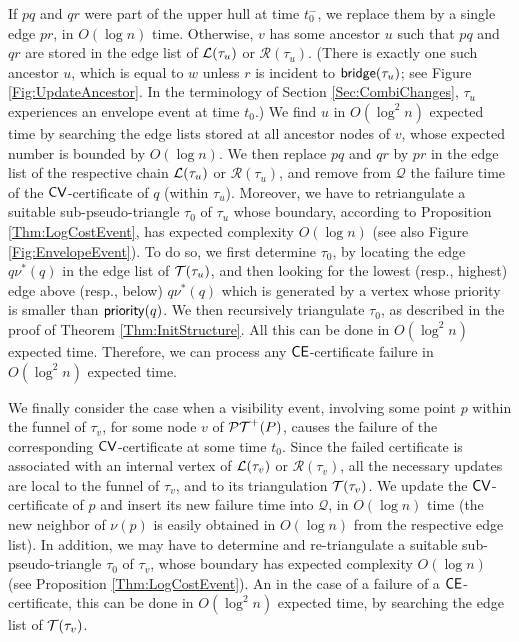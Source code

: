 \documentclass[11pt]{article}
\def\bridge{{\sf bridge}}
\def\PT{{\cal PT}}
\def\CV{{\sf CV}}
\def\CE{{\sf CE}}
\def\T{{\cal T}}
\def\prior{{\sf priority}}
\def\Q{\mathcal{Q}}
\def\L{{\cal L}}
\def\R{\mathcal{R}}
\begin{document}
If $pq$ and $qr$ were part of the upper hull at time $t_0^-$, we replace them by a single edge $pr$, in $O(\log n)$ time.
Otherwise, $v$ has some ancestor $u$ such that $pq$ and $qr$ are stored in the edge list of
$\L(\tau_{u})$ or $\R(\tau_{u})$. (There is exactly one such ancestor $u$, which is equal to $w$ unless $r$ is incident to $\bridge(\tau_u)$; see Figure \ref{Fig:UpdateAncestor}. In the terminology of Section \ref{Sec:CombiChanges}, $\tau_u$ experiences an envelope event at time $t_0$.)
We find $u$ in $O(\log^2n)$ expected time by searching the edge lists stored at all ancestor nodes of $v$, whose expected number is bounded by $O(\log n)$. We then replace $pq$ and $qr$ by $pr$ in the edge list of the respective chain $\L(\tau_u)$ or $\R(\tau_u)$, and remove from $\Q$ the failure
time of the $\CV$-certificate of $q$ (within $\tau_u$).  Moreover, we have
to retriangulate a suitable sub-pseudo-triangle $\tau_0$ of $\tau_u$
whose boundary, according to Proposition \ref{Thm:LogCostEvent}, has
expected complexity $O(\log n)$ (see also Figure \ref{Fig:EnvelopeEvent}).  To do so, we first determine $\tau_0$,
by locating the edge $q\nu^*(q)$ in the edge list of $\T(\tau_u)$, and then looking for
the lowest (resp., highest) edge above (resp., below) $q\nu^*(q)$ which is generated by a vertex whose priority is smaller than $\prior(q)$.
We then recursively
triangulate $\tau_0$, as described in the proof of Theorem
\ref{Thm:InitStructure}. All this can be done in $O(\log^2n)$ expected
time.  Therefore, we can process any
$\CE$-certificate failure in $O(\log^2n)$ expected time.

\smallskip
\noindent {\bf \emph{$\CV$-certificates}.} We finally consider the case when a visibility event, involving some point $p$ within the funnel of $\tau_v$,
for some node $v$ of
$\PT^+(P)$, causes the failure of the corresponding $\CV$-certificate at some time $t_0$.  Since the failed certificate is associated with an
internal vertex of $\L(\tau_v)$ or $\R(\tau_v)$, all the necessary
updates are local to the funnel of $\tau_v$, and to its triangulation
$\T(\tau_v)$.  We update the $\CV$-certificate of $p$ and insert its
new failure time into $\Q$, in $O(\log n)$ time (the new neighbor of $\nu(p)$ is easily obtained in $O(\log n)$ from the respective edge list). In addition, we may
have to determine and re-triangulate a suitable sub-pseudo-triangle
$\tau_0$ of $\tau_v$, whose boundary has expected complexity $O(\log
n)$ (see Proposition \ref{Thm:LogCostEvent}). An in the case of a failure of a $\CE$-certificate, this can be done in $O(\log^2 n)$ expected time, by searching the edge list of $\T(\tau_v)$.
\end{document}
